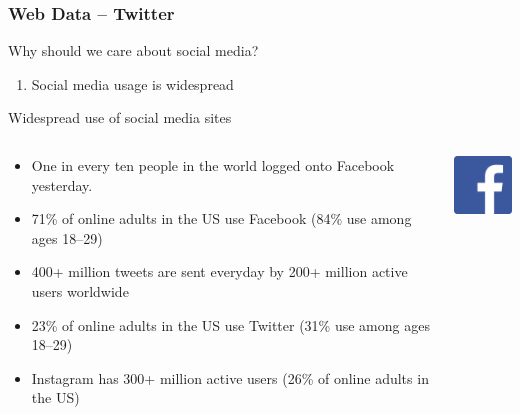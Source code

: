 \documentclass{beamer}
\begin{document}
	

  

\begin{frame}
	\frametitle{Web Data -- Twitter}
	\pause 

\end{frame}



\begin{frame}
	\centering Why should we care about social media? \vspace{.5cm}
	\begin{enumerate}
		\item<2> Social media usage is widespread
	\end{enumerate}
	
\end{frame}


%
\begin{frame}
	Widespread use of social media sites\vspace{.7cm}\\
	\begin{minipage}[0.2\textheight]{\textwidth}
		\begin{columns}[T]
			\begin{column}{0.7\textwidth}
				\begin{itemize}[<+->]
					\item One in every ten people in the world logged onto Facebook yesterday.
					\item 71\% of online adults in the US use Facebook (84\% use among ages 18--29)
					\item 400+ million tweets are sent everyday by 200+ million active users worldwide
					\item 23\% of online adults in the US use Twitter (31\% use among ages 18--29)\\
					\item Instagram has 300+ million active users (26\% of online adults in the US)\\
				\end{itemize}
			\end{column}
			\begin{column}{0.2\textwidth}
				\vspace{.25cm}
				\includegraphics[width=1.8cm]{figures/facebook_logo.png}\\ \vspace{.2cm}

\end{column}
\end{columns}
\end{minipage}
\end{frame}
\end{document}
